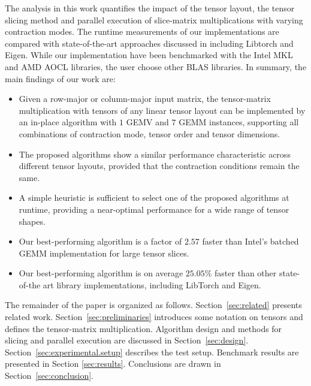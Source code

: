 The analysis in this work quantifies the impact of the tensor layout, the tensor slicing method and parallel execution of slice-matrix multiplications with varying contraction modes.
The runtime measurements of our implementations are compared with state-of-the-art approaches discussed in \citep{springer:2018:design, matthews:2018:high, paszke:2019:pytorch} including Libtorch and Eigen. 
While our implementation have been benchmarked with the Intel MKL and AMD AOCL libraries, the user choose other BLAS libraries.
In summary, the main findings of our work are:
\begin{itemize}
	\item 
	Given a row-major or column-major input matrix, the tensor-matrix multiplication with tensors of any linear tensor layout can be implemented by an in-place algorithm with $1$ GEMV and $7$ GEMM instances, supporting all combinations of contraction mode, tensor order and tensor dimensions.
	\item 
	The proposed algorithms show a similar performance characteristic across different tensor layouts, provided that the contraction conditions remain the same.
	\item 
	A simple heuristic is sufficient to select one of the proposed algorithms at runtime, providing a near-optimal performance for a wide range of tensor shapes.	
	\item 
	Our best-performing algorithm is a factor of $2.57$ faster than Intel's batched GEMM implementation for large tensor slices.
	\item
	Our best-performing algorithm is on average $25.05$\% faster than other state-of-the art library implementations, including LibTorch and Eigen.
\end{itemize}

The remainder of the paper is organized as follows. 
Section~\ref{sec:related} presents related work.
Section~\ref{sec:preliminaries} introduces some notation on tensors and defines the tensor-matrix multiplication.
Algorithm design and methods for slicing and parallel execution are discussed in Section~\ref{sec:design}.
Section~\ref{sec:experimental.setup} describes the test setup. 
Benchmark results are presented in Section \ref{sec:results}.
Conclusions are drawn in Section~\ref{sec:conclusion}.
